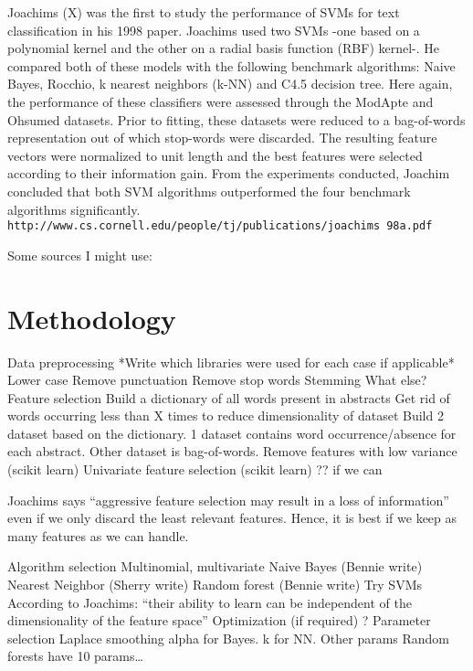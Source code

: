 \documentclass{acm_proc_article-sp}
\begin{document}
Joachims (X) was the first to study the performance of SVMs for text classification in his 1998 paper. Joachims used two SVMs -one based on a polynomial kernel and the other on a radial basis function (RBF) kernel-. He compared both of these models with the following benchmark algorithms: Naive Bayes, Rocchio, k nearest neighbors (k-NN) and C4.5 decision tree. Here again, the performance of these classifiers were assessed through the ModApte and Ohsumed datasets. Prior to fitting, these datasets were reduced to a bag-of-words representation out of which stop-words were discarded. The resulting feature vectors were normalized to unit length and the best features were selected according to their information gain. From the experiments conducted, Joachim concluded that both SVM algorithms outperformed the four benchmark algorithms significantly. \texttt{http://www.cs.cornell.edu/people/tj/publications/joachims 98a.pdf}

Some sources I might use:


\section{Methodology}
Data preprocessing
*Write which libraries were used for each case if applicable*
Lower case
Remove punctuation
Remove stop words
Stemming
What else?	
Feature selection
Build a dictionary of all words present in abstracts
Get rid of words occurring less than X times to reduce dimensionality of dataset
Build 2 dataset based on the dictionary. 1 dataset contains word occurrence/absence for each abstract. Other dataset is bag-of-words.
Remove features with low variance (scikit learn)
Univariate feature selection (scikit learn) ?? if we can

Joachims says “aggressive feature selection may result in a loss of information” even if we only discard the least relevant features. Hence, it is best if we keep as many features as we can handle.

Algorithm selection
Multinomial, multivariate Naive Bayes (Bennie write)
Nearest Neighbor (Sherry write)
Random forest (Bennie write)
Try SVMs According to Joachims: “their ability to learn can be independent of the dimensionality of the feature space”
Optimization (if required)
?
Parameter selection
Laplace smoothing alpha for Bayes.
k for NN. Other params
Random forests have 10 params…
\end{document}
